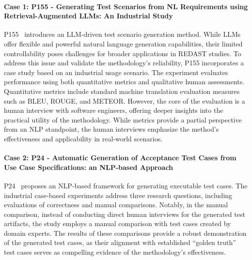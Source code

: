 \paragraph{Case 1: P155 - Generating Test Scenarios from NL Requirements using Retrieval-Augmented LLMs: An Industrial Study} P155~ introduces an LLM-driven test scenario generation method. While LLMs offer flexible and powerful natural language generation capabilities, their limited controllability poses challenges for broader applications in REDAST studies. To address this issue and validate the methodology’s reliability, P155 incorporates a case study based on an industrial usage scenario. The experiment evaluates performance using both quantitative metrics and qualitative human assessments. Quantitative metrics include standard machine translation evaluation measures such as BLEU, ROUGE, and METEOR. However, the core of the evaluation is a human interview with software engineers, offering deeper insights into the practical utility of the methodology. While metrics provide a partial perspective from an NLP standpoint, the human interviews emphasize the method’s effectiveness and applicability in real-world scenarios.

\paragraph{Case 2: P24 - Automatic Generation of Acceptance Test Cases from Use Case Specifications: an NLP-based Approach} P24~ proposes an NLP-based framework for generating executable test cases. The industrial case-based experiments address three research questions, including evaluations of correctness and manual comparisons. Notably, in the manual comparison, instead of conducting direct human interviews for the generated test artifacts, the study employs a manual comparison with test cases created by domain experts. The results of these comparisons provide a robust demonstration of the generated test cases, as their alignment with established “golden truth” test cases serves as compelling evidence of the methodology’s effectiveness.

